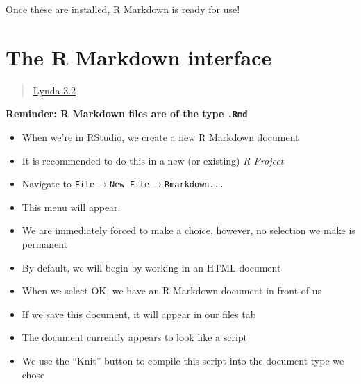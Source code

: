 \documentclass[]{article}
\providecommand{\tightlist}{%
  \setlength{\itemsep}{0pt}\setlength{\parskip}{0pt}}
\begin{document}
Once these are installed, R Markdown is ready for use!

\hypertarget{the-r-markdown-interface}{%
\section{The R Markdown interface}\label{the-r-markdown-interface}}

\begin{quote}
\href{https://www.lynda.com/RStudio-tutorials/R-Markdown-knitting-generating-outputs/699348/2801130-4.html?srchtrk=index\%3a1\%0alinktypeid\%3a2\%0aq\%3ar+markdown\%0apage\%3a1\%0as\%3arelevance\%0asa\%3atrue\%0aproducttypeid\%3a2}{Lynda
3.2}
\end{quote}

\textbf{Reminder: R Markdown files are of the type \texttt{.Rmd}}

\begin{itemize}
\tightlist
\item
  When we're in RStudio, we create a new R Markdown document
\item
  It is recommended to do this in a new (or existing) \emph{R Project}
\item
  Navigate to
  \texttt{File}\(\rightarrow\)\texttt{New\ File}\(\rightarrow\)\texttt{Rmarkdown...}
\item
  This menu will appear.
\end{itemize}

\begin{itemize}
\tightlist
\item
  We are immediately forced to make a choice, however, no selection we
  make is permanent
\item
  By default, we will begin by working in an HTML document
\item
  When we select OK, we have an R Markdown document in front of us
\end{itemize}

\begin{itemize}
\tightlist
\item
  If we save this document, it will appear in our files tab
\end{itemize}

\begin{itemize}
\tightlist
\item
  The document currently appears to look like a script
\item
  We use the ``Knit'' button to compile this script into the document
  type we chose
\end{itemize}
\end{document}
